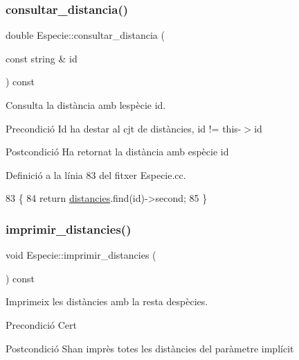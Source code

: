 \subsubsection{\texorpdfstring{consultar\+\_\+distancia()}{consultar\_distancia()}}
{\footnotesize\ttfamily double Especie\+::consultar\+\_\+distancia (\begin{DoxyParamCaption}\item[{const string \&}]{id }\end{DoxyParamCaption}) const}



Consulta la distància amb l\textquotesingle{}espècie id. 

\begin{DoxyPrecond}{Precondició}
Id ha d\textquotesingle{}estar al cjt de distàncies, id != this-\/$>$id 
\end{DoxyPrecond}
\begin{DoxyPostcond}{Postcondició}
Ha retornat la distància amb espècie id 
\end{DoxyPostcond}


Definició a la línia 83 del fitxer Especie.\+cc.


\begin{DoxyCode}
83                                                          \{
84     \textcolor{keywordflow}{return} \hyperlink{class_especie_ad4bbf9359ebc17c3c7f501bc31c86509}{distancies}.find(\textcolor{keywordtype}{id})->second;
85 \}
\end{DoxyCode}
\mbox{\label{class_especie_a305c663aa9f2c8b596e940067fdd6177}} 
\subsubsection{\texorpdfstring{imprimir\+\_\+distancies()}{imprimir\_distancies()}}
{\footnotesize\ttfamily void Especie\+::imprimir\+\_\+distancies (\begin{DoxyParamCaption}{ }\end{DoxyParamCaption}) const}



Imprimeix les distàncies amb la resta d\textquotesingle{}espècies. 

\begin{DoxyPrecond}{Precondició}
Cert 
\end{DoxyPrecond}
\begin{DoxyPostcond}{Postcondició}
S\textquotesingle{}han imprès totes les distàncies del paràmetre implícit 
\end{DoxyPostcond}


